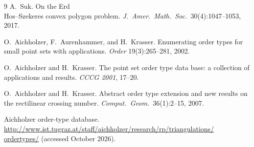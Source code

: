 \documentclass[11pt,a4paper]{article}
\theoremstyle{definition}
\begin{document}
\begin{thebibliography}{9}
 A.~Suk. On the Erd{\\H{o}}s--Szekeres convex polygon problem.
\emph{J.\ Amer.\ Math.\ Soc.\ }30(4):1047--1053, 2017.

 O.~Aichholzer, F.~Aurenhammer, and H.~Krasser. Enumerating order types
for small point sets with applications. \emph{Order }19(3):265--281, 2002.

 O.~Aichholzer and H.~Krasser. The point set order type data base: a
collection of applications and results. \emph{CCCG 2001}, 17--20.

 O.~Aichholzer and H.~Krasser. Abstract order type extension and new
results on the rectilinear crossing number. \emph{Comput.\ Geom.\ }36(1):2--15, 2007.

 Aichholzer order-type database.
\url{http://www.ist.tugraz.at/staff/aichholzer/research/rp/triangulations/}
\allowbreak
\url{ordertypes/} (accessed October 2026).

\end{thebibliography}
\end{document}
